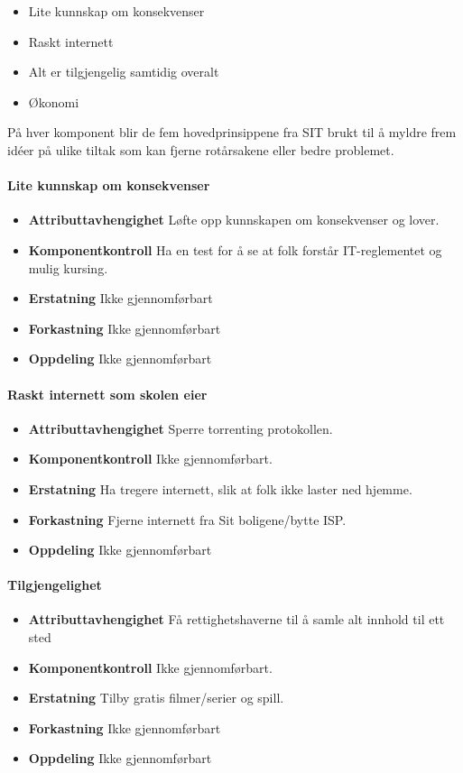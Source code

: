 \begin{itemize}
    \item Lite kunnskap om konsekvenser
    \item Raskt internett
    \item Alt er tilgjengelig samtidig overalt
    \item Økonomi
\end{itemize}

På hver komponent blir de fem hovedprinsippene fra SIT brukt til å myldre frem idéer på ulike tiltak som kan fjerne rotårsakene eller bedre problemet.

\paragraph{Lite kunnskap om konsekvenser}
\begin{itemize}
    \item \textbf{Attributtavhengighet} Løfte opp kunnskapen om konsekvenser og lover.
    \item \textbf{Komponentkontroll} Ha en test for å se at folk forstår IT-reglementet og mulig kursing.
    \item \textbf{Erstatning} Ikke gjennomførbart
    \item \textbf{Forkastning} Ikke gjennomførbart
    \item \textbf{Oppdeling} Ikke gjennomførbart
\end{itemize}

\paragraph{Raskt internett som skolen eier}
\begin{itemize}
    \item \textbf{Attributtavhengighet} Sperre torrenting protokollen.
    \item \textbf{Komponentkontroll} Ikke gjennomførbart.
    \item \textbf{Erstatning} Ha tregere internett, slik at folk ikke laster ned hjemme.
    \item \textbf{Forkastning} Fjerne internett fra Sit boligene/bytte ISP.
    \item \textbf{Oppdeling} Ikke gjennomførbart
\end{itemize}

\paragraph{Tilgjengelighet}
\begin{itemize}
    \item \textbf{Attributtavhengighet} Få rettighetshaverne til å samle alt innhold til ett sted 
    \item \textbf{Komponentkontroll} Ikke gjennomførbart.
    \item \textbf{Erstatning} Tilby gratis filmer/serier og spill.
    \item \textbf{Forkastning} Ikke gjennomførbart
    \item \textbf{Oppdeling} Ikke gjennomførbart
\end{itemize}

